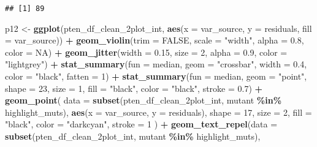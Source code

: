 \documentclass[
]{article}
\newenvironment{Shaded}{\begin{snugshade}}{\end{snugshade}}
\newcommand{\AttributeTok}[1]{\textcolor[rgb]{0.13,0.29,0.53}{#1}}
\newcommand{\ConstantTok}[1]{\textcolor[rgb]{0.56,0.35,0.01}{#1}}
\newcommand{\DecValTok}[1]{\textcolor[rgb]{0.00,0.00,0.81}{#1}}
\newcommand{\FloatTok}[1]{\textcolor[rgb]{0.00,0.00,0.81}{#1}}
\newcommand{\FunctionTok}[1]{\textcolor[rgb]{0.13,0.29,0.53}{\textbf{#1}}}
\newcommand{\NormalTok}[1]{#1}
\newcommand{\OtherTok}[1]{\textcolor[rgb]{0.56,0.35,0.01}{#1}}
\newcommand{\SpecialCharTok}[1]{\textcolor[rgb]{0.81,0.36,0.00}{\textbf{#1}}}
\newcommand{\StringTok}[1]{\textcolor[rgb]{0.31,0.60,0.02}{#1}}
\begin{document}
\begin{verbatim}
## [1] 89
\end{verbatim}

\begin{Shaded}
\begin{Highlighting}[]
\NormalTok{p12 }\OtherTok{\textless{}{-}} \FunctionTok{ggplot}\NormalTok{(pten\_df\_clean\_2plot\_int, }\FunctionTok{aes}\NormalTok{(}\AttributeTok{x =}\NormalTok{ var\_source, }\AttributeTok{y =}\NormalTok{ residuals, }\AttributeTok{fill =}\NormalTok{ var\_source)) }\SpecialCharTok{+}
  \FunctionTok{geom\_violin}\NormalTok{(}\AttributeTok{trim =} \ConstantTok{FALSE}\NormalTok{, }\AttributeTok{scale =} \StringTok{"width"}\NormalTok{, }\AttributeTok{alpha =} \FloatTok{0.8}\NormalTok{, }\AttributeTok{color =} \ConstantTok{NA}\NormalTok{) }\SpecialCharTok{+}
  \FunctionTok{geom\_jitter}\NormalTok{(}\AttributeTok{width =} \FloatTok{0.15}\NormalTok{, }\AttributeTok{size =} \DecValTok{2}\NormalTok{, }\AttributeTok{alpha =} \FloatTok{0.9}\NormalTok{, }\AttributeTok{color =} \StringTok{"lightgrey"}\NormalTok{) }\SpecialCharTok{+}
  \FunctionTok{stat\_summary}\NormalTok{(}\AttributeTok{fun =}\NormalTok{ median, }\AttributeTok{geom =} \StringTok{"crossbar"}\NormalTok{, }\AttributeTok{width =} \FloatTok{0.4}\NormalTok{, }\AttributeTok{color =} \StringTok{"black"}\NormalTok{, }\AttributeTok{fatten =} \DecValTok{1}\NormalTok{) }\SpecialCharTok{+}
  \FunctionTok{stat\_summary}\NormalTok{(}\AttributeTok{fun =}\NormalTok{ median, }\AttributeTok{geom =} \StringTok{"point"}\NormalTok{, }\AttributeTok{shape =} \DecValTok{23}\NormalTok{, }\AttributeTok{size =} \DecValTok{1}\NormalTok{, }\AttributeTok{fill =} \StringTok{"black"}\NormalTok{, }\AttributeTok{color =} \StringTok{"black"}\NormalTok{, }\AttributeTok{stroke =} \FloatTok{0.7}\NormalTok{) }\SpecialCharTok{+}
    \FunctionTok{geom\_point}\NormalTok{(}
    \AttributeTok{data =} \FunctionTok{subset}\NormalTok{(pten\_df\_clean\_2plot\_int, mutant }\SpecialCharTok{\%in\%}\NormalTok{ highlight\_muts),}
    \FunctionTok{aes}\NormalTok{(}\AttributeTok{x =}\NormalTok{ var\_source, }\AttributeTok{y =}\NormalTok{ residuals),}
    \AttributeTok{shape =} \DecValTok{17}\NormalTok{,}
    \AttributeTok{size =} \DecValTok{2}\NormalTok{,}
    \AttributeTok{fill =} \StringTok{"black"}\NormalTok{,}
    \AttributeTok{color =} \StringTok{"darkcyan"}\NormalTok{,}
    \AttributeTok{stroke =} \DecValTok{1}
\NormalTok{  ) }\SpecialCharTok{+} 
  \FunctionTok{geom\_text\_repel}\NormalTok{(}\AttributeTok{data =} \FunctionTok{subset}\NormalTok{(pten\_df\_clean\_2plot\_int, mutant }\SpecialCharTok{\%in\%}\NormalTok{ highlight\_muts),}

\end{Highlighting}
\end{Shaded}
\end{document}
